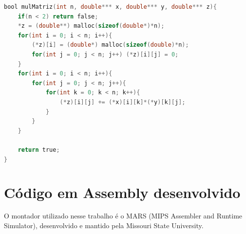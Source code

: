 \documentclass[
	12pt,				%
	oneside,			%
	a4paper,			%
	english,			%
	brazil				%
	]{abntex2ppgsi}
\begin{document}
\begin{lstlisting}[language=C, caption=Resolução de alto nível do exercício 27.C]
bool mulMatriz(int n, double*** x, double*** y, double*** z){
    if(n < 2) return false;
    *z = (double**) malloc(sizeof(double*)*n);
    for(int i = 0; i < n; i++){
        (*z)[i] = (double*) malloc(sizeof(double)*n);
        for(int j = 0; j < n; j++) (*z)[i][j] = 0;
    }
    for(int i = 0; i < n; i++){
        for(int j = 0; j < n; j++){
            for(int k = 0; k < n; k++){
                (*z)[i][j] += (*x)[i][k]*(*y)[k][j];
            }
        }
    }

    return true;
}
\end{lstlisting}

\chapter{Código em Assembly desenvolvido}

O montador utilizado nesse trabalho é o MARS (MIPS Assembler and Runtime Simulator), desenvolvido e mantido pela Missouri State University.
\end{document}
